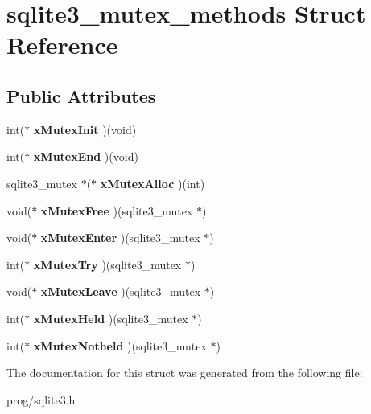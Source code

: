 \hypertarget{structsqlite3__mutex__methods}{}\section{sqlite3\+\_\+mutex\+\_\+methods Struct Reference}
\label{structsqlite3__mutex__methods}
\subsection*{Public Attributes}
\begin{DoxyCompactItemize}
\item 
\mbox{\label{structsqlite3__mutex__methods_a1a163f0e0eaed85223b1537434df635a}} 
int($\ast$ {\bfseries x\+Mutex\+Init} )(void)
\item 
\mbox{\label{structsqlite3__mutex__methods_ab3bc5e370edbeb1db4199d5f609fb09f}} 
int($\ast$ {\bfseries x\+Mutex\+End} )(void)
\item 
\mbox{\label{structsqlite3__mutex__methods_a1c6c36e7f710a5bb8564946595cba324}} 
sqlite3\+\_\+mutex $\ast$($\ast$ {\bfseries x\+Mutex\+Alloc} )(int)
\item 
\mbox{\label{structsqlite3__mutex__methods_a632046a2d4a6372a567a5ac5e8175b30}} 
void($\ast$ {\bfseries x\+Mutex\+Free} )(sqlite3\+\_\+mutex $\ast$)
\item 
\mbox{\label{structsqlite3__mutex__methods_a0237ae1928c2edab7be16e9e007f6a02}} 
void($\ast$ {\bfseries x\+Mutex\+Enter} )(sqlite3\+\_\+mutex $\ast$)
\item 
\mbox{\label{structsqlite3__mutex__methods_aa65a38cee32246dc3257a80ce47be5fe}} 
int($\ast$ {\bfseries x\+Mutex\+Try} )(sqlite3\+\_\+mutex $\ast$)
\item 
\mbox{\label{structsqlite3__mutex__methods_a0d4ef78481d18de5f9346f80321a17b1}} 
void($\ast$ {\bfseries x\+Mutex\+Leave} )(sqlite3\+\_\+mutex $\ast$)
\item 
\mbox{\label{structsqlite3__mutex__methods_a71a26118133388426ddf18ab59ce87f5}} 
int($\ast$ {\bfseries x\+Mutex\+Held} )(sqlite3\+\_\+mutex $\ast$)
\item 
\mbox{\label{structsqlite3__mutex__methods_a5b7c9daa7aea5f01ef9fa58f6d1c5cb1}} 
int($\ast$ {\bfseries x\+Mutex\+Notheld} )(sqlite3\+\_\+mutex $\ast$)
\end{DoxyCompactItemize}


The documentation for this struct was generated from the following file\+:\begin{DoxyCompactItemize}
\item 
prog/sqlite3.\+h\end{DoxyCompactItemize}
